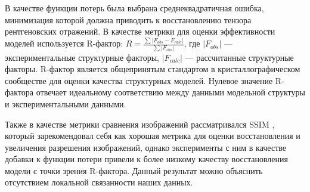 В качестве функции потерь была выбрана среднеквадратичная ошибка, минимизация которой должна приводить к восстановлению тензора рентгеновских отражений. В качестве метрики для оценки эффективности моделей используется R-фактор: $R = \frac{\sum |F_{obs} - F_{calc}|}{\sum |F_{obs}|}$, где $|F_{obs}|$ --- экспериментальные структурные факторы, $|F_{calc}|$ --- рассчитанные структурные факторы. R-фактор является общепринятым стандартом в кристаллографическом сообществе для оценки качества структурных моделей. Нулевое значение R-фактора отвечает идеальному соответствию между данными модельной структуры и экспериментальными данными.

Также в качестве метрики сравнения изображений рассматривался SSIM \cite{zeng_3d-ssim_2012}, который зарекомендовал себя как хорошая метрика для оценки восстановления и увеличения разрешения изображений, однако эксперименты с ним в качестве добавки к функции потери привели к более низкому качеству восстановления модели с точки зрения R-фактора. Данный результат можно объяснить отсутствием локальной связанности наших данных.
